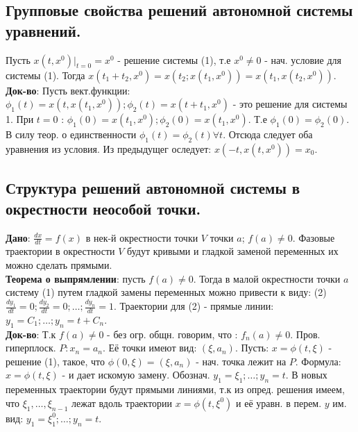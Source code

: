 \documentclass[unicode, 8pt, a4paper,oneside, landscape]{article}
\begin{document}
\begin{multicols}{4}

\subsection{Групповые свойства решений автономной системы уравнений.}

Пусть $x(t, x^0)|_{t=0} = x^0$ - решение системы (1), т.е $x^0 \neq 0$ - нач. условие для системы (1). Тогда $x(t_1 + t_2, x^0) = x(t_2; x(t_1, x^0)) = x(t_1, x(t_2, x^0)).$\\ 
{\bf Док-во}: Пусть вект.функции: $\phi_1(t) = x(t, x(t_1, x^0)); \phi_2(t) = x(t + t_1, x^0)$ - это решение для системы 1. При $t = 0$ : $\phi_1(0) = x(t_1, x^0); \phi_2(0) = x(t_1, x^0)$. Т.е $\phi_1(0) = \phi_2(0)$. В силу теор. о единственности $\phi_1(t) = \phi_2(t) \forall t$. Отсюда следует оба уравнения из условия. Из предыдущег оследует: $x(-t, x(t, x^0)) = x_0$.


\subsection{Структура решений автономной системы в окрестности неособой точки.}

{\bf Дано}: $\frac{dx}{dt} = f(x)$ в нек-й окрестности точки $V$  точки $a$; $f(a) \neq 0$. Фазовые траектории в окрестности $V$ будут кривыми и гладкой заменой переменных их можно сделать прямыми.\\
{\bf Теорема о выпрямлении}: пусть $f(a) \neq 0$. Тогда в малой окрестности точки $a$ систему (1) путем гладкой замены переменных можно привести к виду: (2) $\frac{dy_1}{dt} = 0; \frac{dy_2}{dt} = 0; \ldots; \frac{dy_n}{dt} = 1$. Траектории для (2) - прямые линии: $y_1 = C_1; \ldots; y_n = t+C_n$.\\
{\bf Док-во}: Т.к $f(a) \neq 0$ - без огр. общн. говорим, что : $f_n(a) \neq 0$. Пров. гиперплоск. $P : x_n = a_n$. Её точки имеют вид: $(\xi, a_n)$. Пусть: $x = \phi(t, \xi)$ - решение (1), такое, что $\phi(0, \xi) = (\xi, a_n)$ - нач. точка лежит на $P$. Формула: $x = \phi(t, \xi)$ - и дает искомую замену. Обознач. $y_1 = \xi_1; \ldots; y_n = t$. В новых переменных траектории будут прямыми линиями, т.к из опред. решения имеем, что $\xi_1,\ldots, \xi_{n-1}$ лежат вдоль траектории $x = \phi(t, \xi^0)$ и её уравн. в перем. $y$ им. вид: $y_1 = \xi_1^0; \ldots; y_n = t$.



\end{multicols}
\end{document}
